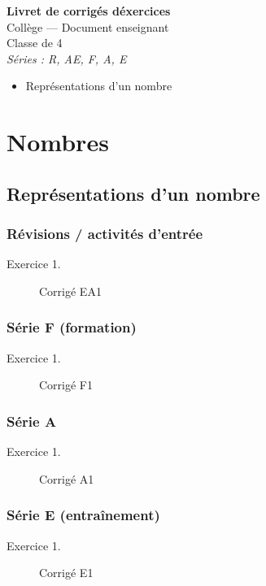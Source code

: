 \documentclass[a4paper,11pt,twoside]{article}
\begin{document}
\providecommand{\theHExoNum}{\theExoNum}

\seqCreeCompteurs
{}

\thispagestyle{empty}
\begin{center}
\vspace*{2em}
{\Huge\bfseries Livret de corrigés d\'exercices}\\[2em]
{\Large Collège — Document enseignant}\\[1em]
{\LARGE Classe de 4\ieme{}}\\[1em]
{\large \emph{Séries : R, AE, F, A, E}}\\[3em]
\end{center}

\begin{itemize}
  \item Représentations d'un nombre
\end{itemize}

\newpage

\thispagestyle{empty}
\tableofcontents
\newpage

\cleardoublepage
{}
\section{Nombres}

\subsection{Représentations d'un nombre}

\subsubsection{Révisions / activités d'entrée}

\begin{description}
  \item[Exercice 1.]\quad
Corrigé EA1

\end{description}

\subsubsection{Série F (formation)}

\begin{description}
  \item[Exercice 1.]\quad
Corrigé F1

\end{description}

\subsubsection{Série A}

\begin{description}
  \item[Exercice 1.]\quad
Corrigé A1

\end{description}

\subsubsection{Série E (entraînement)}

\begin{description}
  \item[Exercice 1.]\quad
Corrigé E1

\end{description}
\end{document}
